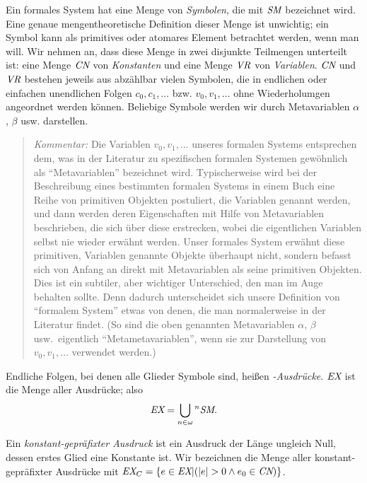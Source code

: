 Ein formales System hat eine Menge von {\em Symbolen}, die mit $\mbox{\em SM}$ bezeichnet wird.  Eine genaue mengentheoretische Definition dieser Menge ist unwichtig; ein Symbol kann als primitives oder atomares Element betrachtet werden, wenn man will.  Wir nehmen an, dass diese Menge in zwei disjunkte Teilmengen unterteilt ist: eine Menge $\mbox{\em CN}$ von {\em Konstanten} und eine Menge $\mbox{\em VR}$ von {\em Variablen}. $\mbox{\em CN}$ und $\mbox{\em VR}$ bestehen jeweils aus abzählbar vielen Symbolen, die in endlichen oder einfachen unendlichen Folgen $c_0, c_1, \ldots$ bzw. $v_0, v_1, \ldots$ ohne Wiederholumgen angeordnet werden können.  Beliebige Symbole werden wir durch Metavariablen $\alpha$, $\beta$ usw. darstellen.

{\footnotesize\begin{quotation}
{\em Kommentar:} Die Variablen $v_0, v_1, \ldots$ unseres formalen Systems ent\-spre\-chen dem, was in der Literatur zu spezifischen formalen Systemen gewöhnlich als "`Metavariablen"' bezeichnet wird.  Typischerweise wird bei der Beschreibung eines bestimmten formalen Systems in einem Buch eine Reihe von primitiven Objekten postuliert, die Variablen genannt werden, und dann werden deren Eigenschaften mit Hilfe von Metavariablen beschrieben, die sich über diese erstrecken, wobei die eigentlichen Variablen selbst nie wieder erwähnt werden.  Unser formales System erwähnt diese primitiven, Variablen genannte Objekte überhaupt nicht, sondern befasst sich von Anfang an direkt mit Metavariablen als seine primitiven Objekten.  Dies ist ein subtiler, aber wichtiger Unterschied, den man im Auge behalten sollte. Denn dadurch unterscheidet sich unsere Definition von "`formalem System"' etwas von denen, die man normalerweise in der Literatur findet.  (So sind die oben genannten Metavariablen $\alpha$, $\beta$ usw.\ eigentlich "`Metametavariablen"', wenn sie zur Darstellung von $v_0, v_1, \ldots$ verwendet werden.)
\end{quotation}}

Endliche Folgen, bei denen alle Glieder Symbole sind, heißen {\em-Ausdrücke}. $\mbox{\em EX}$ ist die Menge aller Ausdrücke; also
\begin{displaymath}
\mbox{\em EX} = \bigcup _{n \in \omega} {}^n \mbox{\em SM}.
\end{displaymath}

Ein {\em konstant-gepräfixter Ausdruck} ist ein Ausdruck der Länge ungleich Null, dessen erstes Glied eine Konstante ist.  Wir bezeichnen die Menge aller konstant-gepräfixter Ausdrücke mit $\mbox{\em EX}_C = \{ e \in \mbox{\em EX} | ( |e| > 0 \wedge e_0 \in \mbox{\em CN} ) \}$.

